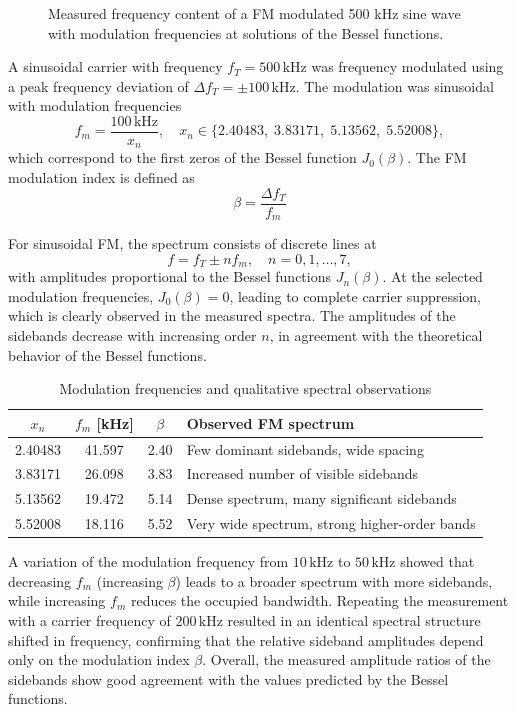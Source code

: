 \documentclass[a4paper,12pt]{article}
\begin{document}
	\subsubsection{}
	
	\begin{figure}[H]
		\centering
		
		\caption{Measured frequency content of a FM modulated 500 kHz sine wave with modulation frequencies at solutions of the Bessel functions.}
		\label{fig:446}
	\end{figure}

	A sinusoidal carrier with frequency $f_T = 500\,\mathrm{kHz}$ was frequency modulated using a peak frequency deviation of $\Delta f_T = \pm 100\,\mathrm{kHz}$. The modulation was sinusoidal with modulation frequencies
	\[
	f_m = \frac{100\,\mathrm{kHz}}{x_n}, \quad x_n \in \{2.40483,\;3.83171,\;5.13562,\;5.52008\},
	\]
	which correspond to the first zeros of the Bessel function $J_0(\beta)$. The FM modulation index is defined as
	\[
	\beta = \frac{\Delta f_T}{f_m}%
	\]
	
	For sinusoidal FM, the spectrum consists of discrete lines at
	\[
	f = f_T \pm n f_m, \quad n = 0,1,\dots,7,
	\]
	with amplitudes proportional to the Bessel functions $J_n(\beta)$. At the selected modulation frequencies, $J_0(\beta)=0$, leading to complete carrier suppression, which is clearly observed in the measured spectra. The amplitudes of the sidebands decrease with increasing order $n$, in agreement with the theoretical behavior of the Bessel functions.
	
	\begin{table}[h]
		\centering
		\caption{Modulation frequencies and qualitative spectral observations}
		\begin{tabular}{c c c l}
			\hline
			$x_n$ & $f_m$ [kHz] & $\beta$ & Observed FM spectrum \\ \hline
			2.40483 & 41.597 & 2.40 & Few dominant sidebands, wide spacing \\
			3.83171 & 26.098 & 3.83 & Increased number of visible sidebands \\
			5.13562 & 19.472 & 5.14 & Dense spectrum, many significant sidebands \\
			5.52008 & 18.116 & 5.52 & Very wide spectrum, strong higher-order bands \\ \hline
		\end{tabular}
	\end{table}
	
	A variation of the modulation frequency from $10\,\mathrm{kHz}$ to $50\,\mathrm{kHz}$ showed that decreasing $f_m$ (increasing $\beta$) leads to a broader spectrum with more sidebands, while increasing $f_m$ reduces the occupied bandwidth. Repeating the measurement with a carrier frequency of $200\,\mathrm{kHz}$ resulted in an identical spectral structure shifted in frequency, confirming that the relative sideband amplitudes depend only on the modulation index $\beta$. Overall, the measured amplitude ratios of the sidebands show good agreement with the values predicted by the Bessel functions.
\end{document}
